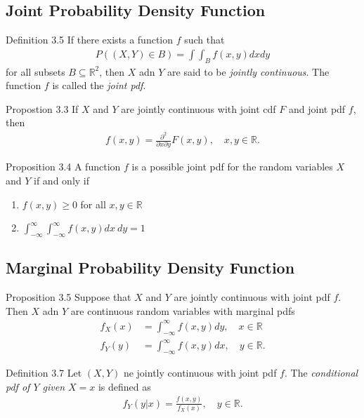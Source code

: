 \subsection{Joint Probability Density Function}
\begin{boks}{Definition 3.5}
If there exists a function $f$ such that
\begin{align*}
    P((X, Y)\in B) = \int\int_B f(x, y) dx dy
\end{align*}
for all subsets $B\subseteq \mathbb{R}^2$, then $X$ adn $Y$ are said to be \textit{jointly continuous}. The function $f$ is called the \textit{joint pdf}.
\end{boks}

\begin{boks}{Propostion 3.3}
If $X$ and $Y$ are jointly continuous with joint cdf $F$ and joint pdf $f$, then
\begin{align*}
    f(x, y) = \frac{\partial^2}{\partial x \partial y} F(x,y), \quad x,y \in \mathbb{R}.
\end{align*}
\end{boks}

\begin{boks}{Proposition 3.4}
A function $f$ is a possible joint pdf for the random variables $X$ and $Y$ if and only if
\begin{enumerate}
    \item $f(x, y) \geq 0$ for all $x,y \in \mathbb{R}$
    \item $\int_{-\infty}^\infty \int_{-\infty}^\infty f(x,y)dx\  dy = 1$
\end{enumerate}
\end{boks}
\subsection{Marginal Probability Density Function}

\begin{boks}{Proposition 3.5}
Suppose that $X$ and $Y$ are jointly continuous with joint pdf $f$. Then $X$ adn $Y$ are continuous random variables with marginal pdfs
\begin{align*}
    f_X(x) &= \int_{-\infty}^\infty f(x, y) dy, \quad x\in\mathbb{R} \\
    f_Y(y) &= \int_{-\infty}^\infty f(x,y) dx, \quad y\in\mathbb{R}.
\end{align*}
\end{boks}

\begin{boks}{Definition 3.7}
Let $(X, Y)$ ne jointly continuous with joint pdf $f$. The \textit{conditional pdf of $Y$ given $X=x$} is defined as
\begin{align*}
    f_Y(y|x) = \frac{f(x,y)}{f_X(x)}, \quad y\in\mathbb{R}.
\end{align*}
\end{boks}
\vspace{-5mm}
